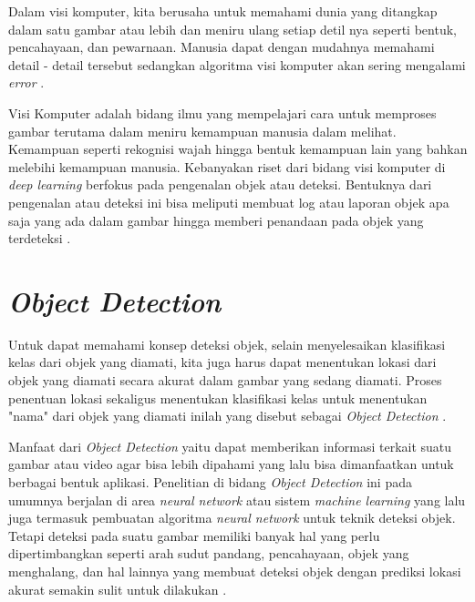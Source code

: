 \par Dalam visi komputer, kita berusaha untuk memahami dunia yang ditangkap dalam satu gambar atau lebih dan meniru ulang setiap detil nya seperti
bentuk, pencahayaan, dan pewarnaan. Manusia dapat dengan mudahnya memahami detail - detail tersebut sedangkan algoritma visi komputer
akan sering mengalami \emph{error} \cite{margaret2008mind}.  


\par Visi Komputer adalah bidang ilmu yang mempelajari cara untuk memproses gambar terutama dalam meniru
kemampuan manusia dalam melihat. Kemampuan seperti rekognisi wajah hingga bentuk kemampuan lain yang bahkan
melebihi kemampuan manusia. Kebanyakan riset dari bidang visi komputer di \emph{deep learning} berfokus pada
pengenalan objek atau deteksi. Bentuknya dari pengenalan atau deteksi ini bisa meliputi membuat log atau laporan
objek apa saja yang ada dalam gambar hingga memberi penandaan pada objek yang terdeteksi \cite{Goodfellow-et-al-2016}. 


\section{\emph{Object Detection}}
\label{sec:objectdetection}


\par Untuk dapat memahami konsep deteksi objek, selain menyelesaikan klasifikasi kelas dari objek yang diamati, kita juga harus dapat
menentukan lokasi dari objek yang diamati secara akurat dalam gambar yang sedang diamati. Proses penentuan lokasi sekaligus menentukan
klasifikasi kelas untuk menentukan "nama" dari objek yang diamati inilah yang disebut sebagai \emph{Object Detection} \cite{felzenszwalb2010object}.

\par Manfaat dari \emph{Object Detection} yaitu dapat memberikan informasi terkait suatu gambar atau video agar bisa lebih dipahami yang lalu bisa dimanfaatkan
untuk berbagai bentuk aplikasi. Penelitian di bidang \emph{Object Detection} ini pada umumnya berjalan di area \emph{neural network} atau sistem \emph{machine learning}
yang lalu juga termasuk pembuatan algoritma \emph{neural network} untuk teknik deteksi objek. Tetapi deteksi pada suatu gambar memiliki banyak
hal yang perlu dipertimbangkan seperti arah sudut pandang, pencahayaan, objek yang menghalang, dan hal lainnya yang membuat 
deteksi objek dengan prediksi lokasi akurat semakin sulit untuk dilakukan \cite{zhao2019object} \cite{girshick2014rich}.


